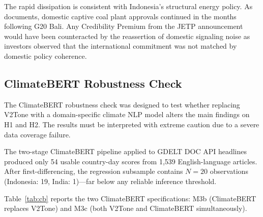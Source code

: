 \documentclass[12pt,a4paper]{article}
\begin{document}
The rapid dissipation is consistent with Indonesia's structural energy policy. As \citet{Neumann2025} documents, domestic captive coal plant approvals continued in the months following G20 Bali. Any Credibility Premium from the JETP announcement would have been counteracted by the reassertion of domestic signaling noise as investors observed that the international commitment was not matched by domestic policy coherence.

\subsection{ClimateBERT Robustness Check}

The ClimateBERT robustness check was designed to test whether replacing V2Tone with a domain-specific climate NLP model alters the main findings on H1 and H2. The results must be interpreted with extreme caution due to a severe data coverage failure.

The two-stage ClimateBERT pipeline applied to GDELT DOC API headlines produced only 54 usable country-day scores from 1,539 English-language articles. After first-differencing, the regression subsample contains $N = 20$ observations (Indonesia: 19, India: 1)---far below any reliable inference threshold.

Table~\ref{tab:cb} reports the two ClimateBERT specifications: M3b (ClimateBERT replaces V2Tone) and M3c (both V2Tone and ClimateBERT simultaneously).
\end{document}

